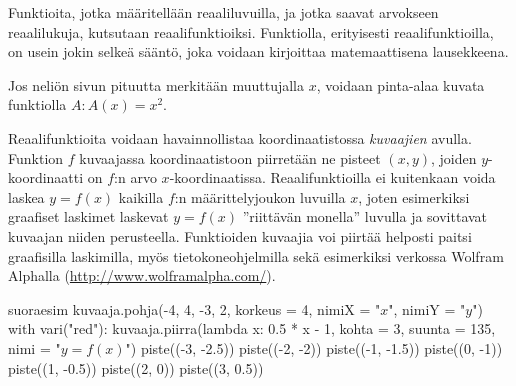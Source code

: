 Funktioita, jotka määritellään reaaliluvuilla, ja jotka saavat arvokseen reaalilukuja, kutsutaan reaalifunktioiksi.
Funktiolla, erityisesti reaalifunktioilla, on usein jokin selkeä sääntö, joka voidaan kirjoittaa matemaattisena lausekkeena.

\begin{esimerkki}
Jos neliön sivun pituutta merkitään muuttujalla $x$, voidaan pinta-alaa kuvata funktiolla $A\colon A(x) = x^2$.
\end{esimerkki} 

Reaalifunktioita voidaan havainnollistaa koordinaatistossa \textit{kuvaajien} avulla. Funktion $f$ kuvaajassa koordinaatistoon piirretään ne pisteet $(x, y)$, joiden $y$-koordinaatti on $f$:n arvo $x$-koordinaatissa. Reaalifunktioilla ei kuitenkaan voida laskea $y = f(x)$ kaikilla $f$:n määrittelyjoukon luvuilla $x$, joten esimerkiksi graafiset laskimet laskevat $y = f(x)$ ''riittävän monella'' luvulla ja sovittavat kuvaajan niiden perusteella. Funktioiden kuvaajia voi piirtää helposti paitsi graafisilla laskimilla, myös tietokoneohjelmilla sekä esimerkiksi verkossa Wolfram Alphalla (\url{http://www.wolframalpha.com/}). 

\def\vcent#1{\mathsurround0pt$\vcenter{\hbox{#1}}$}

\begin{luoKuva}{suoraesim}
    kuvaaja.pohja(-4, 4, -3, 2, korkeus = 4, nimiX = "$x$", nimiY = "$y$")
    with vari("red"): kuvaaja.piirra(lambda x: 0.5 * x - 1, kohta = 3, suunta = 135, nimi = "$y = f(x)$")
    piste((-3, -2.5))
    piste((-2, -2))
    piste((-1, -1.5))
    piste((0, -1))
    piste((1, -0.5))
    piste((2, 0))
    piste((3, 0.5))
\end{luoKuva}

